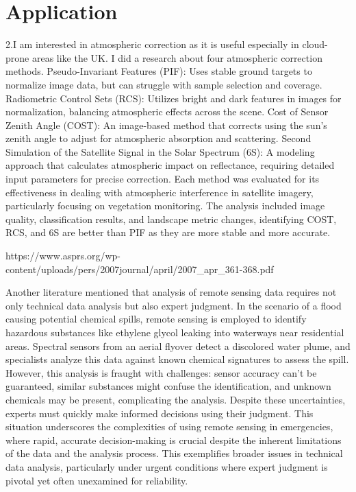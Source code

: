 \documentclass[
  letterpaper,
  DIV=11,
  numbers=noendperiod]{scrreprt}
\begin{document}
\chapter{Application}\label{application-3}

2.I am interested in atmospheric correction as it is useful especially
in cloud-prone areas like the UK. I did a research about four
atmospheric correction methods. Pseudo-Invariant Features (PIF): Uses
stable ground targets to normalize image data, but can struggle with
sample selection and coverage. Radiometric Control Sets (RCS): Utilizes
bright and dark features in images for normalization, balancing
atmospheric effects across the scene. Cost of Sensor Zenith Angle
(COST): An image-based method that corrects using the sun's zenith angle
to adjust for atmospheric absorption and scattering. Second Simulation
of the Satellite Signal in the Solar Spectrum (6S): A modeling approach
that calculates atmospheric impact on reflectance, requiring detailed
input parameters for precise correction. Each method was evaluated for
its effectiveness in dealing with atmospheric interference in satellite
imagery, particularly focusing on vegetation monitoring. The analysis
included image quality, classification results, and landscape metric
changes, identifying COST, RCS, and 6S are better than PIF as they are
more stable and more accurate.

https://www.asprs.org/wp-content/uploads/pers/2007journal/april/2007\_apr\_361-368.pdf

Another literature mentioned that analysis of remote sensing data
requires not only technical data analysis but also expert judgment. In
the scenario of a flood causing potential chemical spills, remote
sensing is employed to identify hazardous substances like ethylene
glycol leaking into waterways near residential areas. Spectral sensors
from an aerial flyover detect a discolored water plume, and specialists
analyze this data against known chemical signatures to assess the spill.
However, this analysis is fraught with challenges: sensor accuracy can't
be guaranteed, similar substances might confuse the identification, and
unknown chemicals may be present, complicating the analysis. Despite
these uncertainties, experts must quickly make informed decisions using
their judgment. This situation underscores the complexities of using
remote sensing in emergencies, where rapid, accurate decision-making is
crucial despite the inherent limitations of the data and the analysis
process. This exemplifies broader issues in technical data analysis,
particularly under urgent conditions where expert judgment is pivotal
yet often unexamined for reliability.
\end{document}
